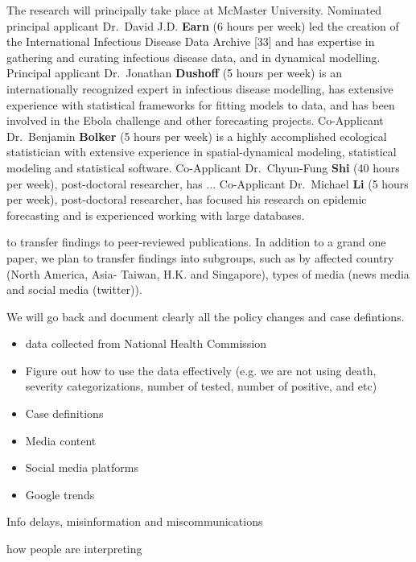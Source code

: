 The research will principally take place at McMaster University. 
Nominated principal applicant Dr.\ David J.D. \textbf{Earn} (6 hours per week) led the creation of the International Infectious Disease Data Archive [33] and has expertise in gathering and curating infectious disease data, and in dynamical modelling.
Principal applicant Dr.\ Jonathan \textbf{Dushoff} (5 hours per week) is an internationally recognized expert in infectious disease modelling, has extensive experience with statistical frameworks for fitting models to data, and has been involved in the Ebola challenge and other forecasting projects. 
Co-Applicant Dr.\ Benjamin \textbf{Bolker} (5 hours per week) is a highly accomplished ecological statistician with extensive experience in spatial-dynamical modeling, statistical modeling and statistical software.
Co-Applicant Dr.\ Chyun-Fung \textbf{Shi} (40 hours per week), post-doctoral researcher, has ...
Co-Applicant Dr.\ Michael \textbf{Li} (5 hours per week), post-doctoral researcher, has focused his research on epidemic forecasting and is experienced working with large databases. 







to transfer findings to peer-reviewed publications.  
In addition to a grand one paper, we plan to transfer findings into subgroups, such as by affected country (North America, Asia- Taiwan, H.K. and Singapore), types of media (news media and social media (twitter)).




We will go back and document clearly all the policy changes and case defintions. 

\begin{itemize}
\item{data collected from National Health Commission}
\item{Figure out how to use the data effectively (e.g. we are not using death, severity categorizations, number of tested, number of positive, and etc)}
\item{Case definitions}
\item{Media content}
\item{Social media platforms}
\item{Google trends}
\end{itemize}


Info delays, misinformation and miscommunications


how people are interpreting 



